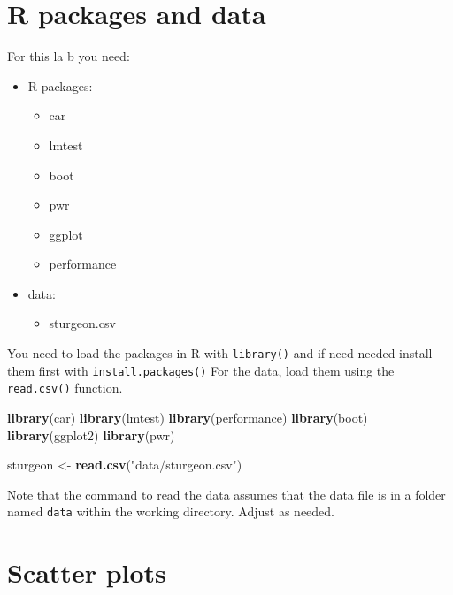 \documentclass[
  12pt,
]{book}
\makeatletter
\newenvironment{Shaded}{\begin{snugshade}}{\end{snugshade}}
\newcommand{\KeywordTok}[1]{\textcolor[rgb]{0.13,0.29,0.53}{\textbf{#1}}}
\newcommand{\NormalTok}[1]{#1}
\newcommand{\StringTok}[1]{\textcolor[rgb]{0.31,0.60,0.02}{#1}}
\providecommand{\tightlist}{%
  \setlength{\itemsep}{0pt}\setlength{\parskip}{0pt}}
\newenvironment{kframe}{%
\medskip{}
\setlength{\fboxsep}{.8em}
\def\at@end@of@kframe{}%
\ifinner\ifhmode%
 \def\at@end@of@kframe{\end{minipage}}%
 \begin{minipage}{\columnwidth}%
\fi\fi%
\def\FrameCommand##1{\hskip\@totalleftmargin \hskip-\fboxsep
\colorbox{incolor}{##1}\hskip-\fboxsep
    \hskip-\linewidth \hskip-\@totalleftmargin \hskip\columnwidth}%
\MakeFramed {\advance\hsize-\width
  \@totalleftmargin\z@ \linewidth\hsize
  \@setminipage}}%
{\par\unskip\endMakeFramed%
\at@end@of@kframe}
\newenvironment{rmdblock}[1]
 {
 \begin{itemize}
 \renewcommand{\labelitemi}{
   \raisebox{-.7\height}[0pt][0pt]{
     {\setkeys{Gin}{width=3em,keepaspectratio}\texttt{[image: images/\#1]}}
   }
 }
 \begin{kframe}
 \setlength{\fboxsep}{1em}
 \item
 }
 {
 \end{kframe}
 \end{itemize}
 }
\newenvironment{rmdnote}
  {\begin{rmdblock}{note}}
  {\end{rmdblock}}
\makeatother
\begin{document}
\hypertarget{set-lm}{%
\section{R packages and data}\label{set-lm}}

For this la b you need:

\begin{itemize}
\tightlist
\item
  R packages:

  \begin{itemize}
  \tightlist
  \item
    car
  \item
    lmtest
  \item
    boot
  \item
    pwr
  \item
    ggplot
  \item
    performance
  \end{itemize}
\item
  data:

  \begin{itemize}
  \tightlist
  \item
    sturgeon.csv
  \end{itemize}
\end{itemize}

You need to load the packages in R with \texttt{library()} and if need needed install them first with \texttt{install.packages()}
For the data, load them using the \texttt{read.csv()} function.

\begin{Shaded}
\begin{Highlighting}[]
\KeywordTok{library}\NormalTok{(car)}
\KeywordTok{library}\NormalTok{(lmtest)}
\KeywordTok{library}\NormalTok{(performance)}
\KeywordTok{library}\NormalTok{(boot)}
\KeywordTok{library}\NormalTok{(ggplot2)}
\KeywordTok{library}\NormalTok{(pwr)}

\NormalTok{sturgeon \textless{}{-}}\StringTok{ }\KeywordTok{read.csv}\NormalTok{(}\StringTok{"data/sturgeon.csv"}\NormalTok{)}
\end{Highlighting}
\end{Shaded}

\begin{rmdnote}
Note that the command to read the data assumes that the data file is in a folder named \texttt{data} within the working directory. Adjust as needed.
\end{rmdnote}

\hypertarget{scatter-plots}{%
\section{Scatter plots}\label{scatter-plots}}
\end{document}
